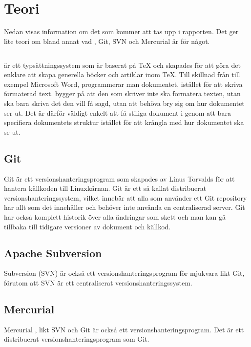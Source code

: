 \section{Teori}
\label{sec:theory-tuhkala}
Nedan visas information om det som kommer att tas upp i rapporten. Det ger lite teori om bland annat vad \latex, Git, SVN och Mercurial är för något.

\subsection{\latex}
\latex \cite{latex_project}\cite{latex_wiki} är ett typsättningssystem som är baserat på TeX och skapades för att göra det enklare att skapa generella böcker och artiklar inom TeX. Till skillnad från till exempel Microsoft Word, programmerar man dokumentet, istället för att skriva formaterad text. \latex bygger på att den som skriver inte ska formatera texten, utan ska bara skriva det den vill få sagd, utan att behöva bry sig om hur dokumentet ser ut. Det är därför väldigt enkelt att få stiliga dokument i \latex genom att bara specifiera dokumentets struktur istället för att krångla med hur dokumentet ska se ut.

\subsection{Git}
Git \cite{git_history}\cite{git} är ett versionshanteringsprogram som skapades av Linus Torvalds för att hantera källkoden till Linuxkärnan. Git är ett så kallat distribuerat versionshanteringssystem, vilket innebär att alla som använder ett Git repository har allt som det innehåller och behöver inte använda en centraliserad server. Git har också komplett historik över alla ändringar som skett och man kan gå tillbaka till tidigare versioner av dokument och källkod.

\subsection{Apache Subversion}
Subversion (SVN) \cite{svn} är också ett versionshanteringsprogram för mjukvara likt Git, förutom att SVN är ett centraliserat versionshanteringssystem.

\subsection{Mercurial}
Mercurial \cite{mercurial}, likt SVN och Git är också ett versionshanteringsprogram. Det är ett distribuerat versionshanteringsprogram som Git.

